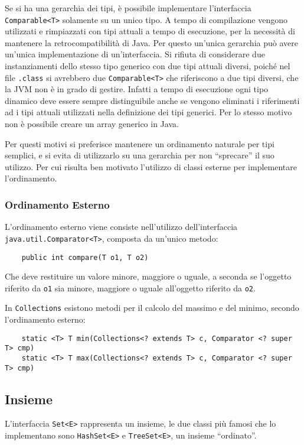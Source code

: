 \documentclass{article}
\numberwithin{equation}{subsection}
\begin{document}
Se si ha una gerarchia dei tipi, è possibile implementare l'interfaccia \verb|Comparable<T>| solamente su un unico tipo. A tempo di compilazione vengono utilizzati e 
rimpiazzati con tipi attuali a tempo di esecuzione, per la necessità di mantenere la retrocompatibilità di Java. Per questo un'unica gerarchia può avere un'unica 
implementazione di un'interfaccia. Si rifiuta di considerare due instanziamenti dello stesso tipo generico con due tipi attuali diversi, poiché nel file \verb|.class| si avrebbero 
due \verb|Comparable<T>| che riferiscono a due tipi diversi, che la JVM non è in grado di gestire. Infatti a tempo di esecuzione ogni tipo dinamico deve essere sempre distinguibile anche 
se vengono eliminati i riferimenti ad i tipi attuali utilizzati nella definizione dei tipi generici. 
Per lo stesso motivo non è possibile creare un array generico in Java. 

Per questi motivi si preferisce mantenere un ordinamento naturale per tipi semplici, e si evita di utilizzarlo su una gerarchia per non ``sprecare'' il suo utilizzo. Per cui 
risulta ben motivato l'utilizzo di classi esterne per implementare l'ordinamento. 

\subsubsection{Ordinamento Esterno}

L'ordinamento esterno viene consiste nell'utilizzo dell'interfaccia \verb|java.util.Comparator<T>|, composta da un'unico metodo:
\begin{verbatim}
    public int compare(T o1, T o2)
\end{verbatim}
Che deve restituire un valore minore, maggiore o uguale, a seconda se l'oggetto riferito da \verb|o1| sia minore, maggiore o uguale all'oggetto riferito da \verb|o2|. 

In \verb|Collections| esistono metodi per il calcolo del massimo e del minimo, secondo l'ordinamento esterno:
\begin{verbatim}
    static <T> T min(Collections<? extends T> c, Comparator <? super T> cmp)
    static <T> T max(Collections<? extends T> c, Comparator <? super T> cmp)
\end{verbatim}

\subsection{Insieme}

L'interfaccia \verb|Set<E>| rappresenta un insieme, le due classi più famosi che lo implementano sono \verb|HashSet<E>| e \verb|TreeSet<E>|, un insieme ``ordinato''. 
\end{document}
